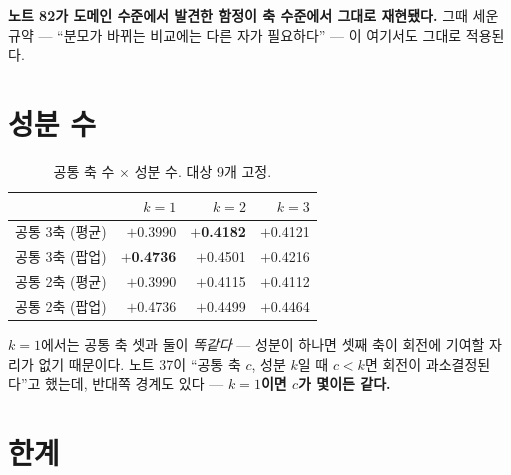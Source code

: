 \documentclass[10pt]{article}
\begin{document}

\textbf{노트 82가 도메인 수준에서 발견한 함정이 축 수준에서 그대로 재현됐다.}
그때 세운 규약 --- ``분모가 바뀌는 비교에는 다른 자가 필요하다'' --- 이 여기서도
그대로 적용된다.

\section{성분 수}

\begin{table}[t]
\centering\tsize
\caption{공통 축 수 $\times$ 성분 수. 대상 9개 고정.}
\begin{tabular}{lrrr}
\toprule
& $k{=}1$ & $k{=}2$ & $k{=}3$ \\
\midrule
공통 3축 (평균) & $+$0.3990 & \textbf{$+$0.4182} & $+$0.4121 \\
공통 3축 (팝업) & \textbf{$+$0.4736} & $+$0.4501 & $+$0.4216 \\
\midrule
공통 2축 (평균) & $+$0.3990 & $+$0.4115 & $+$0.4112 \\
공통 2축 (팝업) & $+$0.4736 & $+$0.4499 & $+$0.4464 \\
\bottomrule
\end{tabular}
\end{table}

$k{=}1$에서는 공통 축 셋과 둘이 \emph{똑같다} --- 성분이 하나면 셋째 축이
회전에 기여할 자리가 없기 때문이다. 노트 37이 ``공통 축 $c$, 성분 $k$일 때
$c<k$면 회전이 과소결정된다''고 했는데, 반대쪽 경계도 있다 --- \textbf{$k{=}1$이면
$c$가 몇이든 같다.}


\section{한계}
\end{document}
